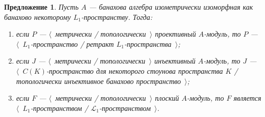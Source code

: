 \documentclass[12pt]{article}
\newtheorem{proposition}[theorem]{Предложение}
\begin{document}
\begin{proposition}\label{TopProjInjFlatModOverL1Charac} Пусть $A$ --- банахова
    алгебра изометрически изоморфная как банахово некоторому $L_1$-пространству.
    Тогда:
    \begin{enumerate}[label = (\roman*)]
        \item если $P$ --- $\langle$~метрически / топологически~$\rangle$
              проективный $A$-модуль, то 
              $P$ --- $\langle$~$L_1$-пространство / ретракт
              $L_1$-пространства~$\rangle$;

        \item если $J$ --- $\langle$~метрически / топологически~$\rangle$
              инъективный $A$-модуль, то 
              $J$ --- $\langle$~$C(K)$-пространство для
              некоторого стоунова пространства $K$ / 
              топологически инъективное банахово пространство~$\rangle$;

        \item если $F$ --- $\langle$~метрически / топологически~$\rangle$ 
              плоский $A$-модуль, то $F$ является 
              $\langle$~$L_1$-пространством /
              $\mathscr{L}_1$-пространством~$\rangle$.
    \end{enumerate}

\end{proposition}
\end{document}
